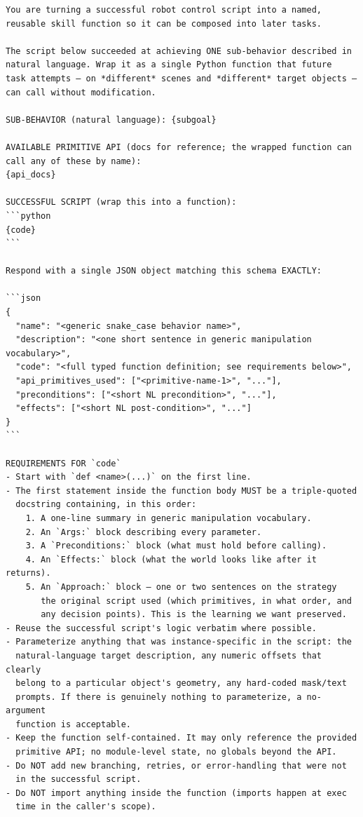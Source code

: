\begin{lstlisting}[style=ratsappendixprompt]
You are turning a successful robot control script into a named,
reusable skill function so it can be composed into later tasks.

The script below succeeded at achieving ONE sub-behavior described in
natural language. Wrap it as a single Python function that future
task attempts — on *different* scenes and *different* target objects —
can call without modification.

SUB-BEHAVIOR (natural language): {subgoal}

AVAILABLE PRIMITIVE API (docs for reference; the wrapped function can
call any of these by name):
{api_docs}

SUCCESSFUL SCRIPT (wrap this into a function):
```python
{code}
```

Respond with a single JSON object matching this schema EXACTLY:

```json
{
  "name": "<generic snake_case behavior name>",
  "description": "<one short sentence in generic manipulation vocabulary>",
  "code": "<full typed function definition; see requirements below>",
  "api_primitives_used": ["<primitive-name-1>", "..."],
  "preconditions": ["<short NL precondition>", "..."],
  "effects": ["<short NL post-condition>", "..."]
}
```

REQUIREMENTS FOR `code`
- Start with `def <name>(...)` on the first line.
- The first statement inside the function body MUST be a triple-quoted
  docstring containing, in this order:
    1. A one-line summary in generic manipulation vocabulary.
    2. An `Args:` block describing every parameter.
    3. A `Preconditions:` block (what must hold before calling).
    4. An `Effects:` block (what the world looks like after it returns).
    5. An `Approach:` block — one or two sentences on the strategy
       the original script used (which primitives, in what order, and
       any decision points). This is the learning we want preserved.
- Reuse the successful script's logic verbatim where possible.
- Parameterize anything that was instance-specific in the script: the
  natural-language target description, any numeric offsets that clearly
  belong to a particular object's geometry, any hard-coded mask/text
  prompts. If there is genuinely nothing to parameterize, a no-argument
  function is acceptable.
- Keep the function self-contained. It may only reference the provided
  primitive API; no module-level state, no globals beyond the API.
- Do NOT add new branching, retries, or error-handling that were not
  in the successful script.
- Do NOT import anything inside the function (imports happen at exec
  time in the caller's scope).


\end{lstlisting}
